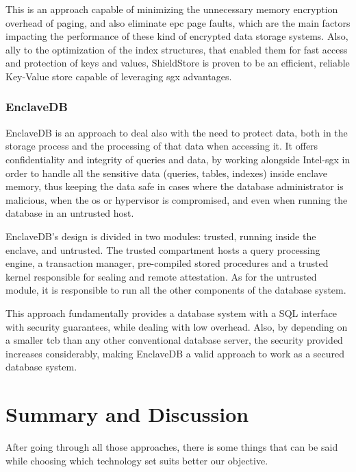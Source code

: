 This is an approach capable of minimizing the unnecessary memory encryption overhead of paging, and also eliminate \gls{epc} page faults, which are the main factors impacting the performance of these kind of encrypted data storage systems. Also, ally to the optimization of the index structures, that enabled them for fast access and protection of keys and values, ShieldStore is proven to be an efficient, reliable Key-Value store capable of leveraging \gls{sgx} advantages.


\subsubsection{EnclaveDB}
\label{sssec:sgxEnclaveDB}
EnclaveDB \cite{enclavedbPaper} is an approach to deal also with the need to protect data, both in the storage process and the processing of that data when accessing it. It offers confidentiality and integrity of queries and data, by working alongside Intel-\gls{sgx} in order to handle all the sensitive data (queries, tables, indexes) inside enclave memory, thus keeping the data safe in cases where the database administrator is malicious, when the \gls{os} or hypervisor is compromised, and even when running the database in an untrusted host. 

EnclaveDB's design is divided in two modules: trusted, running inside the enclave, and untrusted. The trusted compartment hosts a query processing engine, a transaction manager, pre-compiled stored procedures and a trusted kernel responsible for sealing and remote attestation. As for the untrusted module, it is responsible to run all the other components of the database system. 

This approach fundamentally provides a database system with a SQL interface with security guarantees, while dealing with low overhead. Also, by depending on a smaller \gls{tcb} than any other conventional database server, the security provided increases considerably, making EnclaveDB a valid approach to work as a secured database system.




\section{Summary and Discussion}
\label{sec:summary}


After going through all those approaches, there is some things that can be said while choosing which technology set suits better our objective. 

